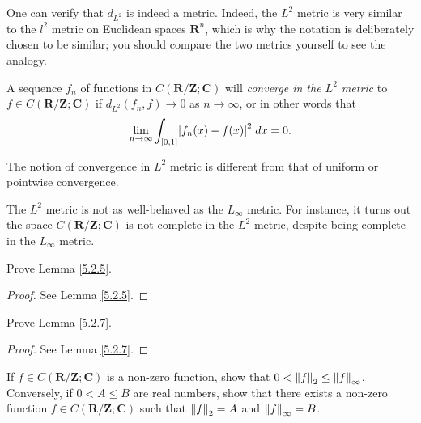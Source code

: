 \begin{remark}\label{5.2.8}
    One can verify that \(d_{L^2}\) is indeed a metric.
    Indeed, the \(L^2\) metric is very similar to the \(l^2\) metric on Euclidean spaces \(\mathbf{R}^n\), which is why the notation is deliberately chosen to be similar;
    you should compare the two metrics yourself to see the analogy.
\end{remark}

\begin{note}
    A sequence \(f_n\) of functions in \(C(\mathbf{R} / \mathbf{Z} ; \mathbf{C})\) will \emph{converge in the \(L^2\) metric} to \(f \in C(\mathbf{R} / \mathbf{Z} ; \mathbf{C})\) if \(d_{L^2}(f_n, f) \to 0\) as \(n \to \infty\), or in other words that
    \[
        \lim_{n \to \infty} \int_{[0, 1]} \abs*{f_n(x) - f(x)}^2 \; dx = 0.
    \]
\end{note}

\begin{remark}\label{5.2.9}
    The notion of convergence in \(L^2\) metric is different from that of uniform or pointwise convergence.
\end{remark}

\begin{remark}\label{5.2.10}
    The \(L^2\) metric is not as well-behaved as the \(L_\infty\) metric.
    For instance, it turns out the space \(C(\mathbf{R} / \mathbf{Z} ; \mathbf{C})\) is not complete in the \(L^2\) metric, despite being complete in the \(L_\infty\) metric.
\end{remark}

\exercisesection

\begin{exercise}\label{ex 5.2.1}
    Prove Lemma \ref{5.2.5}.
\end{exercise}

\begin{proof}
    See Lemma \ref{5.2.5}.
\end{proof}

\begin{exercise}\label{ex 5.2.2}
    Prove Lemma \ref{5.2.7}.
\end{exercise}

\begin{proof}
    See Lemma \ref{5.2.7}.
\end{proof}

\begin{exercise}\label{ex 5.2.3}
    If \(f \in C(\mathbf{R} / \mathbf{Z} ; \mathbf{C})\) is a non-zero function, show that \(0 < \norm*{f}_2 \leq \norm*{f}_\infty\).
    Conversely, if \(0 < A \leq B\) are real numbers, show that there exists a non-zero function \(f \in C(\mathbf{R} / \mathbf{Z} ; \mathbf{C})\) such that \(\norm*{f}_2 = A\) and \(\norm*{f}_\infty = B\).
\end{exercise}

